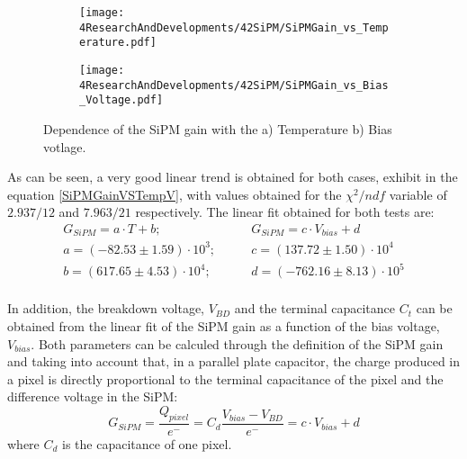 \begin{figure}
\centering
    \begin{subfigure}[b]{0.5\textwidth}
    \centering
    \texttt{[image: 4ResearchAndDevelopments/42SiPM/SiPMGain\_vs\_Temperature.pdf]}  
    \caption{\label{subfig:SiPMGainvsTemperature}}
    \end{subfigure}
    \hfill
    \begin{subfigure}[b]{0.45\textwidth}
    \centering
    \texttt{[image: 4ResearchAndDevelopments/42SiPM/SiPMGain\_vs\_Bias\_Voltage.pdf]}  
    \caption{\label{subfig:SiPMGainvsBiasVoltage}}
    \end{subfigure}
 \caption{Dependence of the SiPM gain with the a) Temperature b) Bias votlage.}
 \label{fig:SiPMGainDependance}
\end{figure}

As can be seen, a very good linear trend is obtained for both cases, exhibit in the equation \ref{SiPMGainVSTempV}, with values obtained for the $\chi^2/ndf$ variable of $2.937/12$ and $7.963/21$ respectively. The linear fit obtained for both tests are:
\begin{equation*}
\begin{split}
G_{SiPM}=a \cdot{} T + b;& \qquad G_{SiPM}=c \cdot{} V_{bias} + d\\
a=\left( -82.53 \pm 1.59 \right) \cdot{} 10^{3};& \qquad c=\left( 137.72 \pm 1.50 \right) \cdot{} 10^{4}\\
b=\left( 617.65 \pm 4.53 \right) \cdot{} 10^{4};& \qquad d=\left( -762.16 \pm 8.13 \right) \cdot{} 10^{5} \\
\label{SiPMGainVSTempV}
\end{split}
\end{equation*} 

In addition, the breakdown voltage, $V_{BD}$ and the terminal capacitance $C_t$ can be obtained from the linear fit of the SiPM gain as a function of the bias voltage, $V_{bias}$. Both parameters can be calculed through the definition of the SiPM gain and taking into account that, in a parallel plate capacitor, the charge produced in a pixel is directly proportional to the terminal capacitance of the pixel and the difference voltage in the SiPM:
\begin{equation}
G_{SiPM}=\frac{Q_{pixel}}{e^-} = C_d \frac{V_{bias}-V_{BD}}{e^-} = c \cdot{} V_{bias}+d
\label{SiPMGain_Capacitance}
\end{equation}
where $C_d$ is the capacitance of one pixel.

